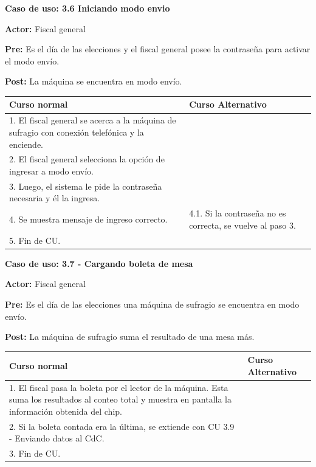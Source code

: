 \textbf{Caso de uso: 3.6 Iniciando modo envio}

\textbf{Actor:} Fiscal general

\textbf{Pre:} Es el día de las elecciones y el fiscal general posee la contraseña para activar el modo envío.

\textbf{Post:} La máquina se encuentra en modo envío.

\begin{table}[h!]
	
 \begin{tabular}{|p{7.5cm} | p{7.5cm}|} 
 \hline
 \textbf{Curso normal} & \textbf{Curso Alternativo} \\
 \hline

1. El fiscal general se acerca a la máquina de sufragio con conexión telefónica y la enciende. & \\
\hline

2. El fiscal general selecciona la opción de ingresar a modo envío. & \\
\hline

3. Luego, el sistema le pide la contraseña necesaria y él la ingresa. & \\
\hline

4. Se muestra mensaje de ingreso correcto. &
4.1. Si la contraseña no es correcta, se vuelve al paso 3. \\
\hline
5. Fin de CU. \\
\hline
\end{tabular}
\end{table}


\textbf{Caso de uso: 3.7 - Cargando boleta de mesa}

\textbf{Actor:} Fiscal general

\textbf{Pre:} Es el día de las elecciones una máquina de sufragio se encuentra en modo envío.

\textbf{Post:} La máquina de sufragio suma el resultado de una mesa más.

\begin{table}[h!]
	
 \begin{tabular}{|p{7.5cm} | p{7.5cm}|} 
 \hline
 \textbf{Curso normal} & \textbf{Curso Alternativo} \\
 \hline

1. El fiscal pasa la boleta por el lector de la máquina. Esta suma los resultados al conteo total y muestra en pantalla la información obtenida del chip. & \\
\hline

2. Si la boleta contada era la última, se extiende con CU 3.9 - Enviando datos al CdC. & \\
\hline

3. Fin de CU. & \\
\hline
\end{tabular}
\end{table}


